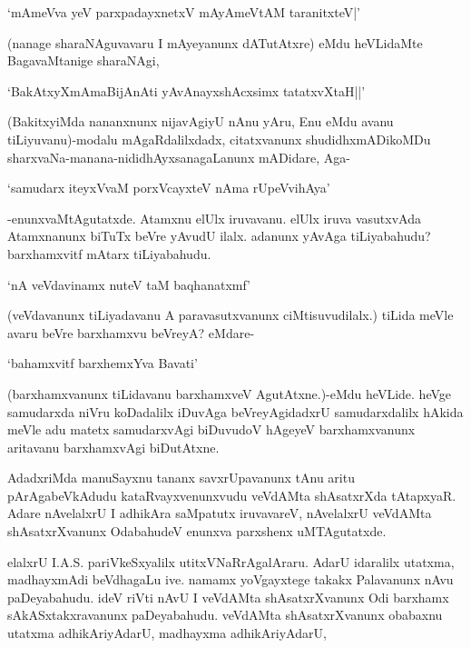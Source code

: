 \begin{shloka}
`mAmeVva yeV parxpadayxnetxV mAyAmeVtAM taranitxteV|'
\end{shloka}

(nanage sharaNAguvavaru I mAyeyanunx dATutAtxre) eMdu heVLidaMte BagavaMtanige sharaNAgi,

\begin{shloka}
`BakAtxyXmAmaBijAnAti yAvAnayxshAcxsimx tatatxvXtaH||'
\end{shloka}

(BakitxyiMda nananxnunx nijavAgiyU nAnu yAru, Enu eMdu avanu tiLiyuvanu)-modalu mAgaRdalilxdadx, citatxvanunx shudidhxmADikoMDu sharxvaNa-manana-nididhAyxsanagaLanunx mADidare, Aga-

\begin{shloka}
`samudarx iteyxVvaM porxVcayxteV nAma rUpeVvihAya'
\end{shloka}

-enunxvaMtAgutatxde. Atamxnu elUlx iruvavanu. elUlx iruva vasutxvAda Atamxnanunx biTuTx beVre yAvudU ilalx. adanunx yAvAga tiLiyabahudu? barxhamxvitf mAtarx tiLiyabahudu.

\begin{shloka}
`nA veVdavinamx nuteV taM baqhanatxmf'
\end{shloka}

(veVdavanunx tiLiyadavanu A paravasutxvanunx ciMtisuvudilalx.) tiLida meVle avaru beVre barxhamxvu beVreyA? eMdare-

\begin{shloka}
`bahamxvitf barxhemxYva Bavati'
\end{shloka}

(barxhamxvanunx tiLidavanu barxhamxveV AgutAtxne.)-eMdu heVLide. heVge samudarxda niVru koDadalilx iDuvAga beVreyAgidadxrU samudarxdalilx hAkida meVle adu matetx samudarxvAgi biDuvudoV hAgeyeV barxhamxvanunx aritavanu barxhamxvAgi biDutAtxne.

AdadxriMda manuSayxnu tananx savxrUpavanunx tAnu aritu pArAgabeVkAdudu kataRvayxvenunxvudu veVdAMta shAsatxrXda tAtapxyaR. Adare nAvelalxrU I adhikAra saMpatutx iruvavareV, nAvelalxrU veVdAMta shAsatxrXvanunx OdabahudeV enunxva parxshenx uMTAgutatxde.

elalxrU {\eng I.A.S.} pariVkeSxyalilx utitxVNaRrAgalAraru. AdarU idaralilx utatxma, madhayxmAdi beVdhagaLu ive. namamx yoVgayxtege takakx Palavanunx nAvu paDeyabahudu. ideV riVti nAvU I veVdAMta shAsatxrXvanunx Odi barxhamx sAkASxtakxravanunx paDeyabahudu. veVdAMta shAsatxrXvanunx obabaxnu utatxma adhikAriyAdarU, madhayxma adhikAriyAdarU,


